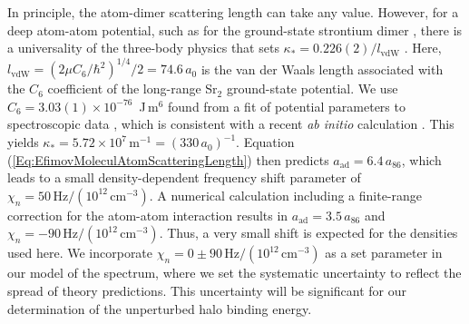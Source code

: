 In principle, the atom-dimer scattering length can take any value. However, for a deep atom-atom potential, such as for the ground-state strontium dimer \cite{skt10}, there is a universality of the three-body physics that sets $\kappa_*=0.226(2)/l_{\mathrm{vdW}}$ \cite{wie12}. Here, $l_{\mathrm{vdW}}=\left({2\mu C_6}/{\hbar^2}\right)^{1/4}/2=74.6$\,$a_0$ is the van der Waals length associated with the $C_6$ coefficient of the long-range Sr$_2$ ground-state potential. We use $C_6=3.03(1) \times 10^{-76}$\, J\,m$^6$ found from a fit of potential parameters to spectroscopic data \cite{skt10}, which is consistent with a recent \textit{ab initio} calculation \cite{zbb14}. This yields $\kappa_*=5.72\times 10^7$\,m$^{-1}=(330\,a_0)^{-1}$. Equation (\ref{Eq:EfimovMoleculAtomScatteringLength}) then predicts $a_{\text{ad}}=6.4\, a_{86}$, which leads to a small density-dependent frequency shift parameter of $\chi_n=50\,\mathrm{Hz}/(10^{12}\,\mathrm{cm}^{-3})$. A numerical calculation including a finite-range correction for the atom-atom interaction \cite{mwc17} results in $a_{\text{ad}}=3.5\, a_{86}$ and $\chi_n=-90\,\mathrm{Hz}/(10^{12}\,\mathrm{cm}^{-3})$. Thus, a very small shift is expected for the densities used here. We incorporate $\chi_n=0\pm 90 \,\mathrm{Hz}/(10^{12}\,\mathrm{cm}^{-3})$ as a set parameter in our model of the spectrum, where we set the systematic uncertainty to reflect the spread of theory predictions. This uncertainty will be significant for our determination of the unperturbed halo binding energy.



%


